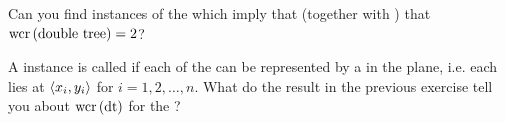 \begin{exercise}
Can you find instances of the  which imply that (together with ) that $\mbox{wcr}\left( \mbox{double tree} \right)=2$?
\end{exercise}

\begin{exercise}
A  instance is called  if each of the  can be represented by a  in the plane, i.e. each  lies at  $\left\langle x_i,y_i \right\rangle$ for $i=1,2,\ldots,n$. What do the result in the previous exercise tell you about $\mbox{wcr}\left( \mbox{dt} \right)$ for the ?
\end{exercise}